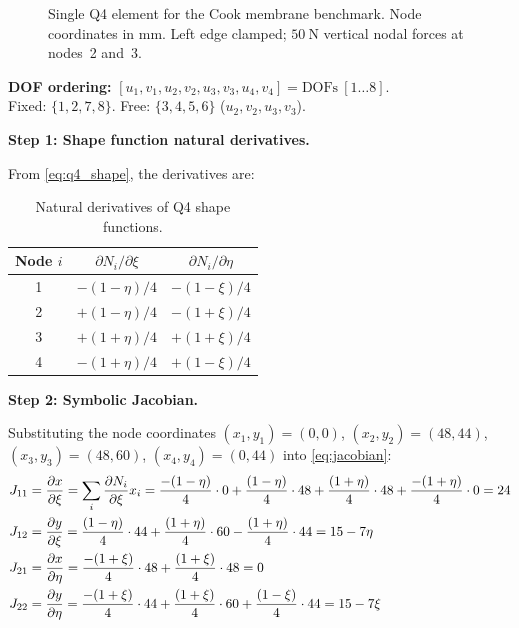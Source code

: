 \begin{example}
\begin{figure}[htbp]
\begin{tikzpicture}[>=Stealth, x=0.07cm, y=0.07cm,
    force/.style={->,ultra thick,red!75!black}]
\end{tikzpicture}
\caption{Single Q4 element for the Cook membrane benchmark.
Node coordinates in mm. Left edge clamped; $50\ \text{N}$ vertical
nodal forces at nodes~2 and~3.}
\label{fig:q4_cook}
\end{figure}

\medskip
\noindent\textbf{DOF ordering:}
$[u_1,v_1,u_2,v_2,u_3,v_3,u_4,v_4] = \text{DOFs}\ [1\ldots8]$.\\
Fixed: $\{1,2,7,8\}$. Free: $\{3,4,5,6\}$ ($u_2,v_2,u_3,v_3$).

\medskip
\noindent\textbf{Step 1: Shape function natural derivatives.}

From \cref{eq:q4_shape}, the derivatives are:

\begin{table}[htbp]
\centering
\small
\caption{Natural derivatives of Q4 shape functions.}
\label{tab:q4_dN}
\begin{tabular}{@{}ccc@{}}
\toprule
Node $i$ & $\partial N_i/\partial\xi$ & $\partial N_i/\partial\eta$ \\
\midrule
1 & $-(1-\eta)/4$ & $-(1-\xi)/4$ \\
2 & $+(1-\eta)/4$ & $-(1+\xi)/4$ \\
3 & $+(1+\eta)/4$ & $+(1+\xi)/4$ \\
4 & $-(1+\eta)/4$ & $+(1-\xi)/4$ \\
\bottomrule
\end{tabular}
\end{table}

\medskip
\noindent\textbf{Step 2: Symbolic Jacobian.}

Substituting the node coordinates $(x_1,y_1)=(0,0)$,
$(x_2,y_2)=(48,44)$, $(x_3,y_3)=(48,60)$, $(x_4,y_4)=(0,44)$
into \cref{eq:jacobian}:
\begin{align}
    J_{11} &= \frac{\partial x}{\partial\xi}
    = \sum_i \frac{\partial N_i}{\partial\xi} x_i
    = \frac{-(1-\eta)}{4}\cdot0 + \frac{(1-\eta)}{4}\cdot48
      + \frac{(1+\eta)}{4}\cdot48 + \frac{-(1+\eta)}{4}\cdot0
    = 24 \notag\\
    J_{12} &= \frac{\partial y}{\partial\xi}
    = \frac{(1-\eta)}{4}\cdot44 + \frac{(1+\eta)}{4}\cdot60
      - \frac{(1+\eta)}{4}\cdot44
    = 15 - 7\eta \notag\\
    J_{21} &= \frac{\partial x}{\partial\eta}
    = \frac{-(1+\xi)}{4}\cdot48 + \frac{(1+\xi)}{4}\cdot48
    = 0 \notag\\
    J_{22} &= \frac{\partial y}{\partial\eta}
    = \frac{-(1+\xi)}{4}\cdot44 + \frac{(1+\xi)}{4}\cdot60
      + \frac{(1-\xi)}{4}\cdot44
    = 15 - 7\xi \notag
\end{align}


\end{example}
